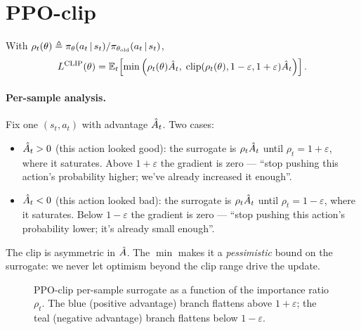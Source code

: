 \documentclass[11pt,oneside]{scrbook}
\begin{document}
\section{PPO-clip}

\begin{definition}
\label{def:ppoclip}
With $\rho_t(\theta) \triangleq \pi_\theta(a_t\,\vert\, s_t)/\pi_{\theta_\text{old}}(a_t\,\vert\, s_t)$,
\[
  L^{\mathrm{CLIP}}(\theta) = \mathbb{E}_t\!\left[\min\Big(\rho_t(\theta) \hat{A}_t,\; \mathrm{clip}(\rho_t(\theta), 1-\varepsilon, 1+\varepsilon) \hat{A}_t \Big)\right].
\]
\end{definition}

\paragraph{Per-sample analysis.} Fix one $(s_t, a_t)$ with advantage $\hat{A}_t$. Two cases:
\begin{itemize}[leftmargin=*]
  \item $\hat{A}_t > 0$ (this action looked good): the surrogate is $\rho_t \hat{A}_t$ until $\rho_t = 1+\varepsilon$, where it saturates. Above $1+\varepsilon$ the gradient is zero --- ``stop pushing this action's probability higher; we've already increased it enough''.
  \item $\hat{A}_t < 0$ (this action looked bad): the surrogate is $\rho_t \hat{A}_t$ until $\rho_t = 1-\varepsilon$, where it saturates. Below $1-\varepsilon$ the gradient is zero --- ``stop pushing this action's probability lower; it's already small enough''.
\end{itemize}
The clip is asymmetric in $\hat{A}$. The $\min$ makes it a \emph{pessimistic} bound on the surrogate: we never let optimism beyond the clip range drive the update.

\begin{figure}[h]
\centering
{}
\caption{PPO-clip per-sample surrogate as a function of the importance ratio $\rho_t$. The blue (positive advantage) branch flattens above $1+\varepsilon$; the teal (negative advantage) branch flattens below $1-\varepsilon$.}
\end{figure}
\end{document}
